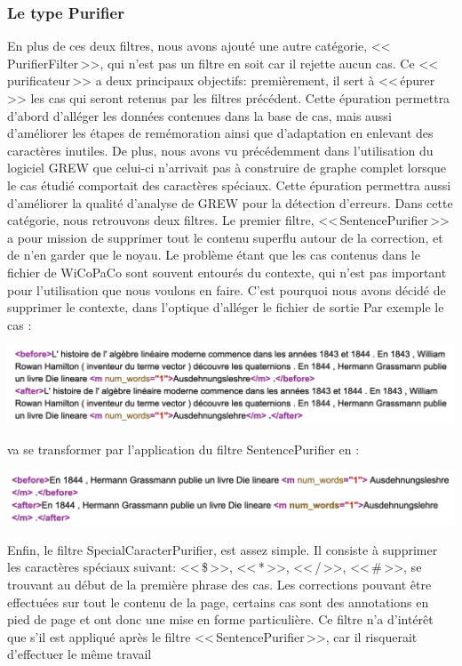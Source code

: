 \documentclass[11pt]{article}
\begin{document}
\subsubsection{Le type Purifier}
En plus de ces deux filtres, nous avons ajout\'{e} une autre cat\'{e}gorie, <<\,PurifierFilter\,>>, qui n'est pas un filtre en soit car il rejette aucun cas. Ce <<\,purificateur\,>> a deux principaux objectifs: premi\`{e}rement, il sert \`{a} <<\,\'{e}purer\,>> les cas qui seront retenus par les filtres pr\'{e}c\'{e}dent. Cette \'{e}puration permettra d'abord d'all\'{e}ger les donn\'{e}es contenues dans la base de cas, mais aussi d'am\'{e}liorer les \'{e}tapes de rem\'{e}moration ainsi que d'adaptation en enlevant des caract\`{e}res inutiles. De plus, nous avons vu pr\'{e}c\'{e}demment dans l'utilisation du logiciel GREW que celui-ci n'arrivait pas \`{a} construire de graphe complet lorsque le cas \'{e}tudi\'{e} comportait des caract\`{e}res sp\'{e}ciaux. Cette \'{e}puration permettra aussi d'am\'{e}liorer la qualit\'{e} d'analyse de GREW pour la d\'{e}tection d'erreurs.
\newline
\newline
Dans cette cat\'{e}gorie, nous retrouvons deux filtres. Le premier filtre, <<\,SentencePurifier\,>> a pour mission de supprimer tout le contenu superflu autour de la correction, et de n'en garder que le noyau. Le probl\`{e}me \'{e}tant que les cas contenus dans le fichier de WiCoPaCo sont souvent entour\'{e}s du contexte, qui n'est pas important pour l'utilisation que nous voulons en faire. C'est pourquoi nous avons d\'{e}cid\'{e} de supprimer le contexte, dans l'optique d'all\'{e}ger le fichier de sortie
Par exemple le cas : 

\begin{center}
\includegraphics[width=14cm]{exemple14.png} %
\end{center}
va se transformer par l'application du filtre SentencePurifier en : 
\begin{center}
\includegraphics[width=14cm]{exemple15.png} %
\end{center}
Enfin, le filtre SpecialCaracterPurifier, est assez simple. Il consiste \`{a} supprimer les caract\`{e}res sp\'{e}ciaux suivant: <<\,\$\,>>, <<\,*\,>>, <<\,/\,>>, <<\,\#\,>>, se trouvant au d\'{e}but de la premi\`{e}re phrase des cas. Les corrections pouvant \^{e}tre effectu\'{e}es sur tout le contenu de la page, certains cas sont des annotations en pied de page et ont donc une mise en forme particuli\`{e}re.
Ce filtre n'a d'int\'{e}r\^{e}t que s'il est appliqu\'{e} apr\`{e}s le filtre <<\,SentencePurifier\,>>, car il risquerait d'effectuer le m\^{e}me travail
\end{document}
